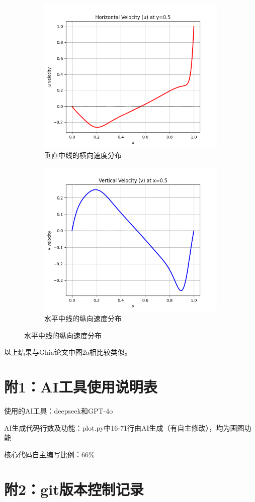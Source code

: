 \documentclass[12pt, a4paper]{article}
\begin{document}
\begin{figure}[htbp]
    \centering
    \begin{subfigure}[b]{0.48\textwidth}
        \includegraphics[width=\textwidth]{pictures/u_at_y_m.png}
        \caption{垂直中线的横向速度分布}
    \end{subfigure}
    \hfill
    \begin{subfigure}[b]{0.48\textwidth}
        \includegraphics[width=\textwidth]{pictures/v_at_x_m.png}
        \caption{水平中线的纵向速度分布}
        \label{fig:sub2}
    \end{subfigure}
\end{figure}

以上结果与Ghia论文中图2a相比较类似。
\section*{附1：AI工具使用说明表}
使用的AI工具：deepseek和GPT-4o

AI生成代码行数及功能：plot.py中16-71行由AI生成（有自主修改），均为画图功能

核心代码自主编写比例：66\%

\section*{附2：git版本控制记录}
\end{document}
